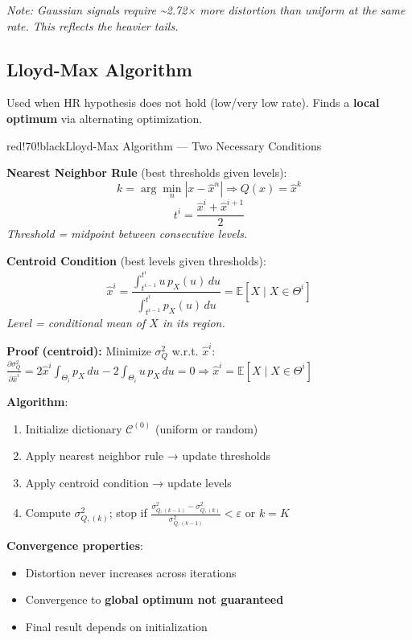 \textit{Note: Gaussian signals require \textasciitilde{}2.72× more distortion than uniform at the same rate. This reflects the heavier tails.}

\subsection{Lloyd-Max Algorithm}

Used when HR hypothesis does not hold (low/very low rate). Finds a \textbf{local optimum} via alternating optimization.

\begin{calloutbox}{red!70!black}{Lloyd-Max Algorithm — Two Necessary Conditions}

\textbf{Nearest Neighbor Rule} (best thresholds given levels):
\[
k = \arg\min_n |x - \hat{x}^n| \Rightarrow Q(x) = \hat{x}^k
\]
\[
t^i = \frac{\hat{x}^i + \hat{x}^{i+1}}{2}
\]
\textit{Threshold = midpoint between consecutive levels.}

\textbf{Centroid Condition} (best levels given thresholds):
\[
\hat{x}^i = \frac{\int_{t^{i-1}}^{t^i} u\,p_X(u)\,du}{\int_{t^{i-1}}^{t^i} p_X(u)\,du} = \mathbb{E}[X\mid X\in\Theta^i]
\]
\textit{Level = conditional mean of $X$ in its region.}

\textbf{Proof (centroid):} Minimize $\sigma_Q^2$ w.r.t. $\hat{x}^i$: $\frac{\partial\sigma_Q^2}{\partial\hat{x}^i} = 2\hat{x}^i\int_{\Theta_i}p_X\,du - 2\int_{\Theta_i}u\,p_X\,du = 0 \Rightarrow \hat{x}^i = \mathbb{E}[X\mid X\in\Theta^i]$
\end{calloutbox}

\textbf{Algorithm}:
\begin{enumerate}
\item Initialize dictionary $\mathcal{C}^{(0)}$ (uniform or random)
\item Apply nearest neighbor rule → update thresholds
\item Apply centroid condition → update levels
\item Compute $\sigma^2_{Q,(k)}$; stop if $\frac{\sigma^2_{Q,(k-1)}-\sigma^2_{Q,(k)}}{\sigma^2_{Q,(k-1)}} < \varepsilon$ or $k = K$
\end{enumerate}

\textbf{Convergence properties}:
\begin{itemize}
\item Distortion never increases across iterations
\item Convergence to \textbf{global optimum not guaranteed}
\item Final result depends on initialization
\end{itemize}

